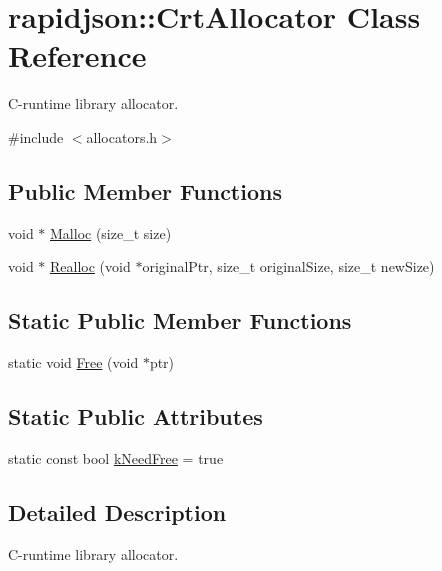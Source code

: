 \hypertarget{classrapidjson_1_1_crt_allocator}{}\section{rapidjson\+::Crt\+Allocator Class Reference}
\label{classrapidjson_1_1_crt_allocator}


C-\/runtime library allocator.  




{\ttfamily \#include $<$allocators.\+h$>$}

\subsection*{Public Member Functions}
\begin{DoxyCompactItemize}
\item 
void $\ast$ \mbox{\hyperlink{classrapidjson_1_1_crt_allocator_aa3dab0aa1b00fc5b6e6cf29708e6667f}{Malloc}} (size\+\_\+t size)
\item 
void $\ast$ \mbox{\hyperlink{classrapidjson_1_1_crt_allocator_a5378ce42f3fe244f8826d85757271ed0}{Realloc}} (void $\ast$original\+Ptr, size\+\_\+t original\+Size, size\+\_\+t new\+Size)
\end{DoxyCompactItemize}
\subsection*{Static Public Member Functions}
\begin{DoxyCompactItemize}
\item 
static void \mbox{\hyperlink{classrapidjson_1_1_crt_allocator_aae4f8a67d7815485fa70b0094e8dbc19}{Free}} (void $\ast$ptr)
\end{DoxyCompactItemize}
\subsection*{Static Public Attributes}
\begin{DoxyCompactItemize}
\item 
static const bool \mbox{\hyperlink{classrapidjson_1_1_crt_allocator_a86a87b7d63be73268c333a7f70f21d24}{k\+Need\+Free}} = true
\end{DoxyCompactItemize}


\subsection{Detailed Description}
C-\/runtime library allocator. 

